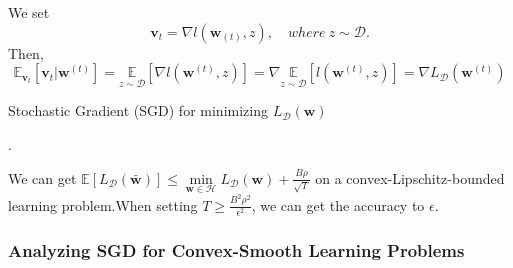 We set
\[ 
	\mathbf{v}_t = \nabla l (\mathbf{w}_{(t)}, z), \quad where\ z \sim \mathcal{D}.
\]
Then,
\[ 
	\mathbb{E}_{\mathbf{v}_t} [\mathbf{v}_t | \mathbf{w}^{(t)}]
	= \underset{z\sim\mathcal{D}}{\mathbb{E}} [\nabla l (\mathbf{w}^{(t)}, z)]
	= \nabla \underset{z\sim\mathcal{D}}{\mathbb{E}} [l (\mathbf{w}^{(t)}, z)]
	= \nabla L_{\mathcal{D}}(\mathbf{w}^{(t)})
\]

\begin{algorithm}[h!]
	\caption{Stochastic Gradient (SGD) for minimizing $ L_{\mathcal{D}}(\mathbf{w}) $}
	\begin{algorithmic}
		\EndFor.
	\end{algorithmic}
\end{algorithm}

We can get $ \mathbb{E} [L_{\mathcal{D}}(\bar{\mathbf{w}})]  \le
\underset{\mathbf{w} \in \mathcal{H}}{\min} L_{\mathcal{D}}(\mathbf{w})+ \frac{B\rho}{\sqrt{T}} $
 on a convex-Lipschitz-bounded learning problem.When setting $ T \ge \frac{B^2 \rho^2}{\epsilon^2} $,
 we can get the accuracy to $ \epsilon $.

 \subsubsection{Analyzing SGD for Convex-Smooth Learning Problems}

